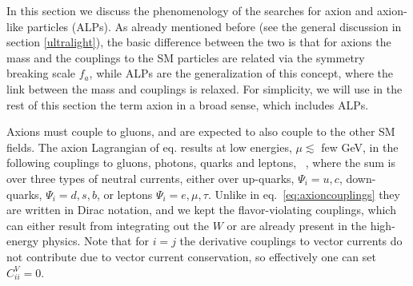 In this section we discuss the phenomenology of the searches for axion and axion-like particles (ALPs). 
As already mentioned before (see the general discussion in section \ref{ultralight}), the basic difference between the two is that for axions the mass and the couplings to the SM particles are related via the symmetry breaking scale $f_a$, while ALPs are the generalization of this concept, where the link between the mass and couplings is relaxed. 
For simplicity, we will use in the rest of this section  the term axion in a broad sense, which includes ALPs.

\medskip

Axions must couple to gluons, and are expected to also couple to the other SM fields. 
The axion Lagrangian of eq. results at low energies, $\mu\lesssim $ few GeV, in the following couplings to gluons, photons, quarks and leptons, 
\beq\label{eq:effective:axion:Lag}
~,
\eeq
where the sum is over three types of neutral currents, 
either over up-quarks, $\Psi_i=u,c$, down-quarks, $\Psi_i=d,s,b$, or leptons $\Psi_i=e, \mu, \tau$.
Unlike in eq.~\eqref{eq:axioncouplings} they are written in Dirac notation, and
we kept the flavor-violating couplings, 
which can either result from integrating out the $W$ or are already present in the high-energy physics.  
Note that for $i=j$ the derivative couplings to vector currents do not contribute due to vector current conservation, so effectively one can set $C_{ii}^V=0$.


